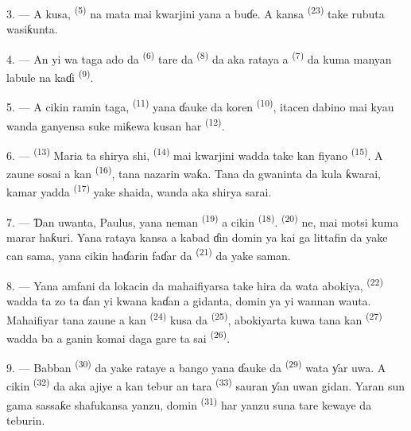 3. --- A kusa,  \textsuperscript{(5)} na mata
mai kwarjini yana a buɗe. A kansa 
\textsuperscript{(23)} take rubuta wasiƙunta.

4. --- An yi wa taga ado da 
\textsuperscript{(6)} tare da  \textsuperscript{(8)} da
aka rataya a  \textsuperscript{(7)} da kuma manyan
labule na kaɗi 
\textsuperscript{(9)}.

5. --- A cikin ramin taga, 
\textsuperscript{(11)} yana ɗauke da koren 
\textsuperscript{(10)}, itacen dabino mai kyau wanda ganyensa suke
miƙewa kusan har  \textsuperscript{(12)}.

6. ---  \textsuperscript{(13)} Maria ta shirya
shi,  \textsuperscript{(14)} mai kwarjini wadda take kan
fiyano \textsuperscript{(15)}. A zaune sosai a kan  \textsuperscript{(16)}, tana nazarin waƙa. Tana da gwaninta da
kula ƙwarai, kamar yadda 
\textsuperscript{(17)} yake shaida, wanda aka shirya sarai.

\VUsaut{5.0mm}
\VUsaut{3.0mm}

7. --- Ɗan uwanta, Paulus, yana neman 
\textsuperscript{(19)} a cikin 
\textsuperscript{(18)}.  \textsuperscript{(20)} ne, mai
motsi kuma marar haƙuri. Yana rataya kansa a kabad ɗin domin ya kai ga
littafin da yake can sama, yana cikin haɗarin faɗar da
 \textsuperscript{(21)} da yake saman.

8. --- Yana amfani da lokacin da mahaifiyarsa take hira da wata
abokiya,  \textsuperscript{(22)} wadda ta zo ta ɗan yi
kwana kaɗan a gidanta, domin ya yi wannan wauta. Mahaifiyar tana
zaune a kan  \textsuperscript{(24)} kusa da  \textsuperscript{(25)}, abokiyarta kuwa tana kan
 \textsuperscript{(27)} wadda ba a ganin komai daga
gare ta sai  \textsuperscript{(26)}.

9. --- Babban  \textsuperscript{(30)} da yake rataye a
bango yana ɗauke da  \textsuperscript{(29)} wata ƴar uwa.
A cikin  \textsuperscript{(32)} da aka ajiye a
kan tebur an tara  \textsuperscript{(33)} sauran ƴan
uwan gidan. Yaran sun gama sassaƙe shafukansa yanzu, domin
 \textsuperscript{(31)} har yanzu suna tare kewaye da
teburin.

